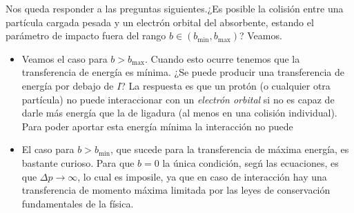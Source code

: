 \begin{enumerate}[label=\alph*)]
    Nos queda responder a las preguntas siguientes.¿Es posible la colisión entre una partícula cargada pesada y un electrón orbital del absorbente, estando el parámetro de impacto fuera del rango $b \in (b_{\min}, b_{\max})$? Veamos. 
    \begin{itemize}
        \item Veamos el caso para $b>b_{\max}$. Cuando esto ocurre tenemos que la transferencia de energía es mínima. ¿Se puede producir una transferencia de energía por debajo de $I$? La respuesta es que un protón (o cualquier otra partícula) no puede interaccionar con un \textit{electrón orbital} si no es capaz de darle más energía que la de ligadura (al menos en una colisión individual). Para poder aportar esta energía mínima la interacción no puede 
        \item El caso para $b>b_{\min}$, que sucede para la transferencia de máxima energía, es bastante curioso. Para que $b=0$ la única condición, segń las ecuaciones, es que $\Delta p \to \infty$, lo cual es imposile, ya que en caso de interacción hay una transferencia de momento máxima limitada por las leyes de conservación fundamentales de la física. 
    \end{itemize}

\end{enumerate}

